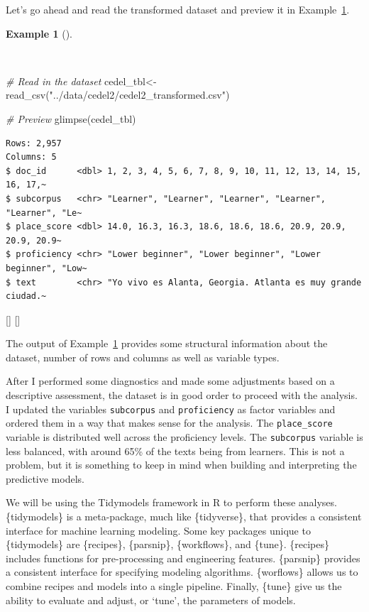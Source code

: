 \documentclass[
  letterpaper,
  krantz1]{latex/krantz-mod}
\newenvironment{Shaded}{\begin{snugshade}}{\end{snugshade}}
\newcommand{\CommentTok}[1]{\textcolor[rgb]{0.00,0.00,0.00}{\textit{#1}}}
\newcommand{\FunctionTok}[1]{\textcolor[rgb]{0.00,0.00,0.00}{#1}}
\newcommand{\NormalTok}[1]{\textcolor[rgb]{0.00,0.00,0.00}{#1}}
\newcommand{\OtherTok}[1]{\textcolor[rgb]{0.00,0.00,0.00}{#1}}
\newcommand{\StringTok}[1]{\textcolor[rgb]{0.00,0.00,0.00}{#1}}
\newcommand{\cindex}[1]{%
  \StrSubstitute{#1}{_}{\_}[\temp]%
  \index{\temp}%
}
\theoremstyle{definition}
\theoremstyle{definition}
\newtheorem{example}{Example}[chapter]
\theoremstyle{remark}
\begin{document}
Let's go ahead and read the transformed dataset and preview it in
Example~\ref{exm-predict-cedel-read}.

\begin{example}[]\protect\hypertarget{exm-predict-cedel-read}{}\label{exm-predict-cedel-read}

~

\begin{Shaded}
\begin{Highlighting}[numbers=left,,]
\CommentTok{\# Read in the dataset}
\NormalTok{cedel\_tbl}\OtherTok{\textless{}{-}}
  \FunctionTok{read\_csv}\NormalTok{(}\StringTok{"../data/cedel2/cedel2\_transformed.csv"}\NormalTok{)}

\CommentTok{\# Preview}
\FunctionTok{glimpse}\NormalTok{(cedel\_tbl)}
\end{Highlighting}
\end{Shaded}

\begin{verbatim}
Rows: 2,957
Columns: 5
$ doc_id      <dbl> 1, 2, 3, 4, 5, 6, 7, 8, 9, 10, 11, 12, 13, 14, 15, 16, 17,~
$ subcorpus   <chr> "Learner", "Learner", "Learner", "Learner", "Learner", "Le~
$ place_score <dbl> 14.0, 16.3, 16.3, 18.6, 18.6, 18.6, 20.9, 20.9, 20.9, 20.9~
$ proficiency <chr> "Lower beginner", "Lower beginner", "Lower beginner", "Low~
$ text        <chr> "Yo vivo es Alanta, Georgia. Atlanta es muy grande ciudad.~
\end{verbatim}

 \cindex{read_csv()}\cindex{glimpse()}

\end{example}

The output of Example~\ref{exm-predict-cedel-read} provides some
structural information about the dataset, number of rows and columns as
well as variable types.

After I performed some diagnostics and made some adjustments based on a
descriptive assessment, the dataset is in
good order to proceed with the analysis. I updated the variables
\texttt{subcorpus} and \texttt{proficiency} as factor variables and
ordered them in a way that makes sense for the analysis. The
\texttt{place\_score} variable is distributed well across the
proficiency levels. The \texttt{subcorpus} variable is less balanced,
with around 65\% of the texts being from learners. This is not a
problem, but it is something to keep in mind when building and
interpreting the predictive models.

We will be using the Tidymodels framework in R to
perform these analyses. \{tidymodels\} is a meta-package, much like
\{tidyverse\}, that provides a consistent interface for machine learning
modeling. Some key packages unique to \{tidymodels\} are \{recipes\},
\{parsnip\}, \{workflows\}, and \{tune\}. \{recipes\} includes functions
for pre-processing and engineering features. \{parsnip\} provides a
consistent interface for specifying modeling algorithms. \{worflows\}
allows us to combine recipes and models into a single pipeline. Finally,
\{tune\} give us the ability to evaluate and adjust, or `tune', the
parameters of models.
\end{document}
